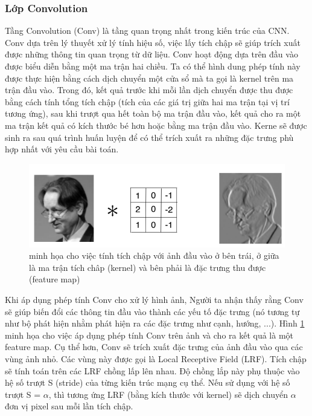 \subsubsection{Lớp Convolution}
Tầng Convolution (Conv) là tầng quan trọng nhất trong kiến trúc của CNN. Conv dựa trên lý thuyết xử lý tính hiệu số, việc lấy tích chập sẽ giúp trích xuất được những thông tin quan trọng từ dữ liệu. Conv hoạt động dựa trên đầu vào được biểu diễn bằng một ma trận hai chiều. Ta có thể hình dung phép tính này được thực hiện bằng cách dịch chuyển một cửa sổ mà ta gọi là kernel trên ma trận đầu vào. Trong đó, kết quả trước khi mỗi lần dịch chuyển được thu được bằng cách tính tổng tích chập (tích của các giá trị giữa hai ma trận tại vị trí tương ứng), sau khi trượt qua hết toàn bộ ma trận đầu vào, kết quả cho ra một ma trận kết quả có kích thước bé hơn hoặc bằng ma trận đầu vào. Kerne sẽ được sinh ra sau quá trình huấn luyện để có thể trích xuất ra những đặc trưng phù hợp nhất với yêu cầu bài toán. \par
\begin{figure}[ht]
  			\begin{center}
    				\includegraphics[scale=0.6]{Conv}
    				\caption[Caption for LOF]{minh họa cho việc tính tích chập với ảnh đầu vào ở bên trái, ở giữa là ma trận tích châp (kernel) và bên phải là đặc trưng thu được  (feature map)} 
    				\label{Conv}
  			\end{center}
\end{figure}	
	Khi áp dụng phép tính Conv cho xử lý hình ảnh, Người ta nhận thấy rằng Conv sẽ giúp biến đổi các thông tin đầu vào thành các yếu tố đặc trưng (nó tương tự như bộ phát hiện nhằm phát hiện ra các đặc trưng như cạnh, hướng, ...). Hình \ref{Conv} minh họa cho việc áp dụng phép tính Conv trên ảnh và cho ra kết quả là một feature map. Cụ thể hơn, Conv sẽ trích xuất đặc trưng của ảnh đầu vào qua các vùng ảnh nhỏ. Các vùng này được gọi là Local Receptive Field (LRF). Tích chập sẽ tính toán trên các LRF chồng lấp lên nhau. Độ chồng lắp này phụ thuộc vào hệ số trượt S (stride) của từng kiến trúc mạng cụ thể. Nếu sử dụng với hệ số trượt S = $\alpha$, thì tương ứng LRF (bằng kích thước với kernel) sẽ dịch chuyển $\alpha$ đơn vị pixel sau mỗi lần tích chập.  \par

